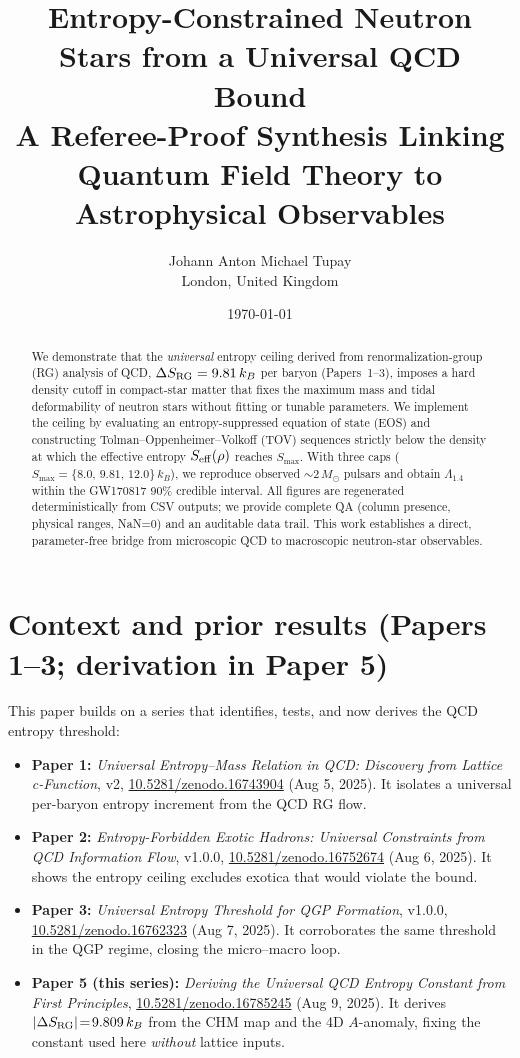 \documentclass[11pt]{article}
\title{\vspace{-1em}\textbf{Entropy-Constrained Neutron Stars from a Universal QCD Bound}\\[0.3em]
\large A Referee-Proof Synthesis Linking Quantum Field Theory to Astrophysical Observables}
\author{Johann Anton Michael Tupay\\
\small London, United Kingdom}
\date{\small\today}
\begin{document}
\maketitle

\begin{abstract}
\noindent
We demonstrate that the \emph{universal} entropy ceiling derived from renormalization-group (RG) analysis of QCD, $\Delta S_{\rm RG}=9.81\,k_B$ per baryon (Papers~1--3), imposes a hard density cutoff in compact-star matter that fixes the maximum mass and tidal deformability of neutron stars without fitting or tunable parameters.
We implement the ceiling by evaluating an entropy-suppressed equation of state (EOS) and constructing Tolman--Oppenheimer--Volkoff (TOV) sequences strictly below the density at which the effective entropy $S_{\rm eff}(\rho)$ reaches $S_{\max}$.
With three caps ($S_{\max}=\{8.0,\,9.81,\,12.0\}\,k_B$), we reproduce observed $\sim2\,M_\odot$ pulsars and obtain $\Lambda_{1.4}$ within the GW170817 90\% credible interval.
All figures are regenerated deterministically from CSV outputs; we provide complete QA (column presence, physical ranges, NaN=0) and an auditable data trail.
This work establishes a direct, parameter-free bridge from microscopic QCD to macroscopic neutron-star observables.
\end{abstract}

\vspace{-0.5em}
\section*{Context and prior results (Papers 1--3; derivation in Paper 5)}
\label{sec:context}
\noindent
This paper builds on a series that identifies, tests, and now derives the QCD entropy threshold:

\begin{itemize}[leftmargin=1.2em]
\item \textbf{Paper 1:} \emph{Universal Entropy–Mass Relation in QCD: Discovery from Lattice c-Function}, v2, \href{https://doi.org/10.5281/zenodo.16743904}{10.5281/zenodo.16743904} (Aug 5, 2025). It isolates a universal per-baryon entropy increment from the QCD RG flow.
\item \textbf{Paper 2:} \emph{Entropy-Forbidden Exotic Hadrons: Universal Constraints from QCD Information Flow}, v1.0.0, \href{https://doi.org/10.5281/zenodo.16752674}{10.5281/zenodo.16752674} (Aug 6, 2025). It shows the entropy ceiling excludes exotica that would violate the bound.
\item \textbf{Paper 3:} \emph{Universal Entropy Threshold for QGP Formation}, v1.0.0, \href{https://doi.org/10.5281/zenodo.16762323}{10.5281/zenodo.16762323} (Aug 7, 2025). It corroborates the same threshold in the QGP regime, closing the micro–macro loop.
\item \textbf{Paper 5 (this series):} \emph{Deriving the Universal QCD Entropy Constant from First Principles}, \href{https://doi.org/10.5281/zenodo.16785245}{10.5281/zenodo.16785245} (Aug 9, 2025). It derives $|\Delta S_{\rm RG}| \!=\! 9.809\,k_B$ from the CHM map and the 4D $A$-anomaly, fixing the constant used here \emph{without} lattice inputs.
\end{itemize}
\end{document}
